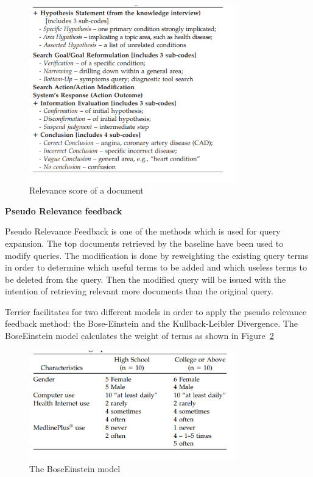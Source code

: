 \documentclass[]{article}
\begin{document}
\begin{figure}[t!]
	\includegraphics[width=0.8\textwidth]{Capture8.png}
	\caption{Relevance score of a document \label{fig8}}
\end{figure} 

\textbf{Pseudo Relevance feedback}

Pseudo Relevance Feedback is one of the methods which is used for query expansion. The top documents retrieved by the baseline have been used to modify queries. The modification is done by reweighting the existing query terms in order to determine which useful terms to be added and which useless terms to be deleted from the query. Then the modified query will be issued with the intention of retrieving relevant more documents than the original query.
 
Terrier facilitates for two different models in order to apply the pseudo relevance feedback method: the Bose-Einstein and the Kullback-Leibler Divergence. The BoseEinstein model calculates the weight of terms as shown in Figure~\ref{fig9}

\begin{figure}[b!]
	\includegraphics[width=0.8\textwidth]{Capture9.png}
	\caption{The BoseEinstein model \label{fig9}}
\end{figure} 
\end{document}
